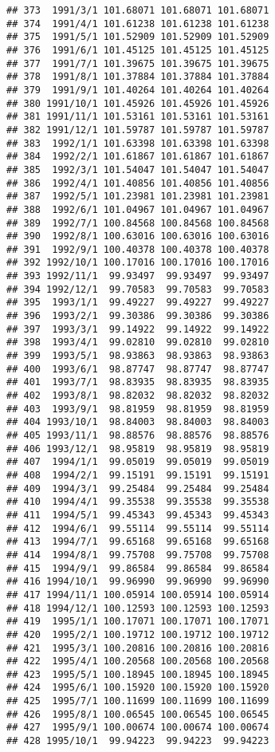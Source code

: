 \documentclass[
]{article}
\begin{document}
\begin{verbatim}
## 373  1991/3/1 101.68071 101.68071 101.68071
## 374  1991/4/1 101.61238 101.61238 101.61238
## 375  1991/5/1 101.52909 101.52909 101.52909
## 376  1991/6/1 101.45125 101.45125 101.45125
## 377  1991/7/1 101.39675 101.39675 101.39675
## 378  1991/8/1 101.37884 101.37884 101.37884
## 379  1991/9/1 101.40264 101.40264 101.40264
## 380 1991/10/1 101.45926 101.45926 101.45926
## 381 1991/11/1 101.53161 101.53161 101.53161
## 382 1991/12/1 101.59787 101.59787 101.59787
## 383  1992/1/1 101.63398 101.63398 101.63398
## 384  1992/2/1 101.61867 101.61867 101.61867
## 385  1992/3/1 101.54047 101.54047 101.54047
## 386  1992/4/1 101.40856 101.40856 101.40856
## 387  1992/5/1 101.23981 101.23981 101.23981
## 388  1992/6/1 101.04967 101.04967 101.04967
## 389  1992/7/1 100.84568 100.84568 100.84568
## 390  1992/8/1 100.63016 100.63016 100.63016
## 391  1992/9/1 100.40378 100.40378 100.40378
## 392 1992/10/1 100.17016 100.17016 100.17016
## 393 1992/11/1  99.93497  99.93497  99.93497
## 394 1992/12/1  99.70583  99.70583  99.70583
## 395  1993/1/1  99.49227  99.49227  99.49227
## 396  1993/2/1  99.30386  99.30386  99.30386
## 397  1993/3/1  99.14922  99.14922  99.14922
## 398  1993/4/1  99.02810  99.02810  99.02810
## 399  1993/5/1  98.93863  98.93863  98.93863
## 400  1993/6/1  98.87747  98.87747  98.87747
## 401  1993/7/1  98.83935  98.83935  98.83935
## 402  1993/8/1  98.82032  98.82032  98.82032
## 403  1993/9/1  98.81959  98.81959  98.81959
## 404 1993/10/1  98.84003  98.84003  98.84003
## 405 1993/11/1  98.88576  98.88576  98.88576
## 406 1993/12/1  98.95819  98.95819  98.95819
## 407  1994/1/1  99.05019  99.05019  99.05019
## 408  1994/2/1  99.15191  99.15191  99.15191
## 409  1994/3/1  99.25484  99.25484  99.25484
## 410  1994/4/1  99.35538  99.35538  99.35538
## 411  1994/5/1  99.45343  99.45343  99.45343
## 412  1994/6/1  99.55114  99.55114  99.55114
## 413  1994/7/1  99.65168  99.65168  99.65168
## 414  1994/8/1  99.75708  99.75708  99.75708
## 415  1994/9/1  99.86584  99.86584  99.86584
## 416 1994/10/1  99.96990  99.96990  99.96990
## 417 1994/11/1 100.05914 100.05914 100.05914
## 418 1994/12/1 100.12593 100.12593 100.12593
## 419  1995/1/1 100.17071 100.17071 100.17071
## 420  1995/2/1 100.19712 100.19712 100.19712
## 421  1995/3/1 100.20816 100.20816 100.20816
## 422  1995/4/1 100.20568 100.20568 100.20568
## 423  1995/5/1 100.18945 100.18945 100.18945
## 424  1995/6/1 100.15920 100.15920 100.15920
## 425  1995/7/1 100.11699 100.11699 100.11699
## 426  1995/8/1 100.06545 100.06545 100.06545
## 427  1995/9/1 100.00674 100.00674 100.00674
## 428 1995/10/1  99.94223  99.94223  99.94223

\end{verbatim}
\end{document}
